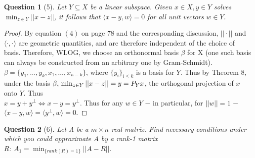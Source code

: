 \documentclass[11pt]{article}
\theoremstyle{quest}
\newtheorem*{question}{Question}
\begin{document}
\begin{question}[5]
Let $Y \subseteq X$ be a linear subspace. Given $x \in X, y \in Y$ solves $\min_{z \in Y} ||x-z||$, it follows that $\langle x-y, w \rangle = 0$ for all unit vectors $w \in Y$.
\end{question}
\begin{proof}
By equation $(4)$ on page $78$ and the corresponding discussion, $|| \cdot ||$ and $\langle \cdot, \cdot \rangle$ are geometric quantities, and are therefore independent of the choice of basis. Therefore, WLOG, we choose an orthonormal basis $\beta$ for X (one such basis can always be constructed from an arbitrary one by Gram-Schmidt). $\beta = \{y_1, \ldots, y_k, x_1, \ldots, x_{n-k}\}$, where $\{y_i\}_{i \le k}$ is a basis for $Y$. Thus by Theorem $8$, under the basis $\beta,\\ \min_{z \in Y} ||x-z|| = y = P_Y x$, the orthogonal projection of $x$ onto $Y$. Thus
\\$x = y + y^{\perp} \iff x-y = y^{\perp}$. Thus for any $w \in Y$ $\mathbf{-}$ in particular, for $||w|| = 1$ $\mathbf{-}$ $\langle x-y, w \rangle = \langle y^{\perp}, w \rangle = 0$.
\end{proof}
\begin{question}[6]
Let A be a $m \times n$ real matrix. Find necessary conditions under which you could approximate $A$ by a rank-1 matrix $R:\ A_1 = \min_{\{rank(R) = 1\}}||A-R||$.
\end{question}
\end{document}
